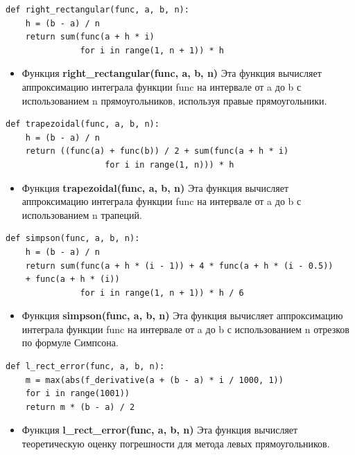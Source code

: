 \documentclass{article}
\begin{document}
\begin{lstlisting}
def right_rectangular(func, a, b, n):
    h = (b - a) / n
    return sum(func(a + h * i)
               for i in range(1, n + 1)) * h
\end{lstlisting}

\begin{itemize}
\item Функция \textbf{right\_rectangular(func, a, b, n)} Эта функция вычисляет аппроксимацию интеграла функции func на интервале от a до b с использованием n прямоугольников, используя правые прямоугольники.
\end{itemize}

\begin{lstlisting}
def trapezoidal(func, a, b, n):
    h = (b - a) / n
    return ((func(a) + func(b)) / 2 + sum(func(a + h * i)
                    for i in range(1, n))) * h
\end{lstlisting}


\begin{itemize}
\item Функция \textbf{trapezoidal(func, a, b, n)} Эта функция вычисляет аппроксимацию интеграла функции func на интервале от a до b с использованием n трапеций.
\end{itemize}

\begin{lstlisting}
def simpson(func, a, b, n):
    h = (b - a) / n
    return sum(func(a + h * (i - 1)) + 4 * func(a + h * (i - 0.5))
    + func(a + h * (i))
               for i in range(1, n + 1)) * h / 6
\end{lstlisting}

\begin{itemize}
\item Функция \textbf{simpson(func, a, b, n)} Эта функция вычисляет аппроксимацию интеграла функции func на интервале от a до b с использованием n отрезков по формуле Симпсона.
\end{itemize}


\begin{lstlisting}
def l_rect_error(func, a, b, n):
    m = max(abs(f_derivative(a + (b - a) * i / 1000, 1))
    for i in range(1001))
    return m * (b - a) / 2
\end{lstlisting}

\begin{itemize}
\item Функция \textbf{l\_rect\_error(func, a, b, n)} Эта функция вычисляет теоретическую оценку погрешности для метода левых прямоугольников.
\end{itemize}
\end{document}
